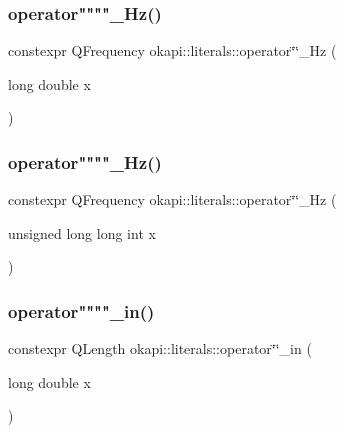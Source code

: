\mbox{\label{namespaceokapi_1_1literals_a5eebec7681b16d83e30ec18032e85229}} 
\subsubsection{\texorpdfstring{operator""""\_Hz()}{operator""\_Hz()}\hspace{0.1cm}{\footnotesize\ttfamily [1/2]}}
{\footnotesize\ttfamily constexpr Q\+Frequency okapi\+::literals\+::operator\char`\"{}\char`\"{}\+\_\+\+Hz (\begin{DoxyParamCaption}\item[{long double}]{x }\end{DoxyParamCaption})}

\mbox{\label{namespaceokapi_1_1literals_a04d29d461c1f7eb8da83798d144be459}} 
\subsubsection{\texorpdfstring{operator""""\_Hz()}{operator""\_Hz()}\hspace{0.1cm}{\footnotesize\ttfamily [2/2]}}
{\footnotesize\ttfamily constexpr Q\+Frequency okapi\+::literals\+::operator\char`\"{}\char`\"{}\+\_\+\+Hz (\begin{DoxyParamCaption}\item[{unsigned long long int}]{x }\end{DoxyParamCaption})}

\mbox{\label{namespaceokapi_1_1literals_afad4d7e9c13571cf2ec0dde7e0008a72}} 
\subsubsection{\texorpdfstring{operator""""\_in()}{operator""\_in()}\hspace{0.1cm}{\footnotesize\ttfamily [1/2]}}
{\footnotesize\ttfamily constexpr Q\+Length okapi\+::literals\+::operator\char`\"{}\char`\"{}\+\_\+in (\begin{DoxyParamCaption}\item[{long double}]{x }\end{DoxyParamCaption})}


